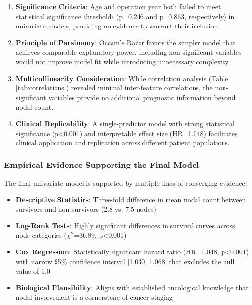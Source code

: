 \documentclass[12pt,a4paper]{article}
\begin{document}
\begin{enumerate}
    \item \textbf{Significance Criteria}: Age and operation year both failed to meet statistical significance thresholds (p=0.246 and p=0.863, respectively) in univariate models, providing no evidence to warrant their inclusion.
    
    \item \textbf{Principle of Parsimony}: Occam's Razor favors the simpler model that achieves comparable explanatory power. Including non-significant variables would not improve model fit while introducing unnecessary complexity.
    
    \item \textbf{Multicollinearity Consideration}: While correlation analysis (Table \ref{tab:correlations}) revealed minimal inter-feature correlations, the non-significant variables provide no additional prognostic information beyond nodal count.
    
    \item \textbf{Clinical Replicability}: A single-predictor model with strong statistical significance (p<0.001) and interpretable effect size (HR=1.048) facilitates clinical application and replication across different patient populations.
\end{enumerate}

\subsubsection{Empirical Evidence Supporting the Final Model}

The final univariate model is supported by multiple lines of converging evidence:

\begin{itemize}
    \item \textbf{Descriptive Statistics}: Three-fold difference in mean nodal count between survivors and non-survivors (2.8 vs. 7.5 nodes)
    
    \item \textbf{Log-Rank Tests}: Highly significant differences in survival curves across node categories (\(\chi^2\)=36.89, p<0.001)
    
    \item \textbf{Cox Regression}: Statistically significant hazard ratio (HR=1.048, p<0.001) with narrow 95\% confidence interval [1.030, 1.068] that excludes the null value of 1.0
    
    \item \textbf{Biological Plausibility}: Aligns with established oncological knowledge that nodal involvement is a cornerstone of cancer staging
\end{itemize}
\end{document}
